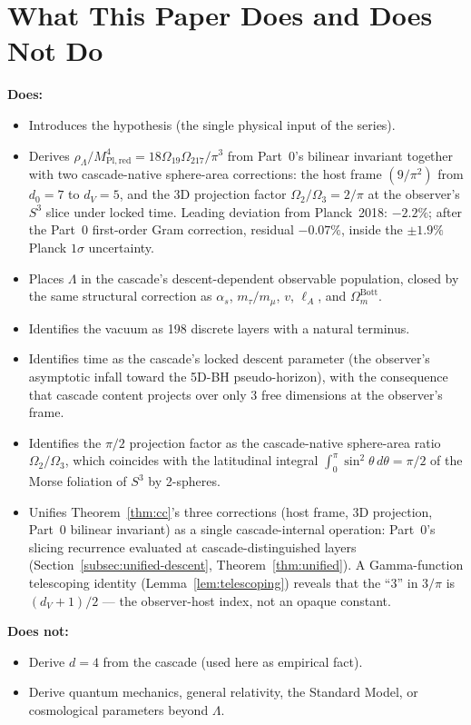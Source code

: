 \documentclass[11pt,a4paper]{article}
\begin{document}
\section{What This Paper Does and Does Not Do}\label{sec:what-this-paper-does-and-does-not-do}

\textbf{Does:}
\begin{itemize}
\item Introduces the hypothesis (the single physical input of the series).
\item Derives
$\rho_\Lambda/M^4_{\mathrm{Pl,red}} = 18\Omega_{19}\Omega_{217}/\pi^3$
from Part~0's bilinear invariant together with two cascade-native
sphere-area corrections: the host frame $(9/\pi^2)$ from $d_0=7$ to
$d_V=5$, and the 3D projection factor $\Omega_2/\Omega_3 = 2/\pi$ at
the observer's $S^3$ slice under locked time. Leading deviation from
Planck~2018: $-2.2\%$; after the Part~0 first-order Gram
correction, residual $-0.07\%$, inside the $\pm 1.9\%$ Planck
$1\sigma$ uncertainty.
\item Places $\Lambda$ in the cascade's descent-dependent observable
population, closed by the same structural correction as $\alpha_s$,
$m_\tau/m_\mu$, $v$, $\ell_A$, and $\Omega_m^{\mathrm{Bott}}$.
\item Identifies the vacuum as 198 discrete layers with a natural terminus.
\item Identifies time as the cascade's locked descent parameter (the
observer's asymptotic infall toward the 5D-BH pseudo-horizon), with
the consequence that cascade content projects over only 3 free
dimensions at the observer's frame.
\item Identifies the $\pi/2$ projection factor as the cascade-native
sphere-area ratio $\Omega_2/\Omega_3$, which coincides with the
latitudinal integral $\int_0^\pi\sin^2\theta\,d\theta = \pi/2$ of the
Morse foliation of $S^3$ by 2-spheres.
\item Unifies Theorem~\ref{thm:cc}'s three corrections (host frame,
3D projection, Part~0 bilinear invariant) as a single cascade-internal
operation: Part~0's slicing recurrence evaluated at cascade-distinguished
layers (Section~\ref{subsec:unified-descent}, Theorem~\ref{thm:unified}).
A Gamma-function telescoping identity
(Lemma~\ref{lem:telescoping}) reveals that the ``3'' in $3/\pi$ is
$(d_V + 1)/2$ --- the observer-host index, not an opaque constant.
\end{itemize}

\textbf{Does not:}
\begin{itemize}
\item Derive $d = 4$ from the cascade (used here as empirical fact).
\item Derive quantum mechanics, general relativity, the Standard Model, or
cosmological parameters beyond $\Lambda$.
\end{itemize}
\end{document}
